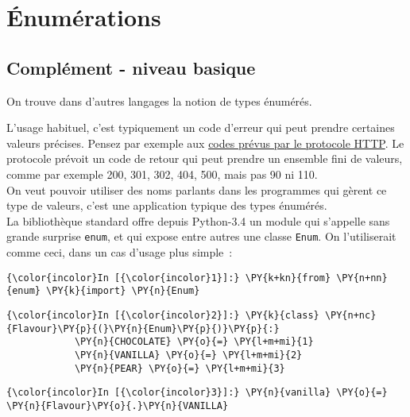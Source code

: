     \hypertarget{uxe9numuxe9rations}{%
\section{Énumérations}\label{uxe9numuxe9rations}}

    \hypertarget{compluxe9ment---niveau-basique}{%
\subsection{Complément - niveau
basique}\label{compluxe9ment---niveau-basique}}

    On trouve dans d'autres langages la notion de types énumérés.

    L'usage habituel, c'est typiquement un code d'erreur qui peut prendre
certaines valeurs précises. Pensez par exemple aux
\href{https://fr.wikipedia.org/wiki/Liste_des_codes_HTTP}{codes prévus
par le protocole HTTP}. Le protocole prévoit un code de retour qui peut
prendre un ensemble fini de valeurs, comme par exemple 200, 301, 302,
404, 500, mais pas 90 ni 110.\\

    On veut pouvoir utiliser des noms parlants dans les programmes qui
gèrent ce type de valeurs, c'est une application typique des types
énumérés.\\

    La bibliothèque standard offre depuis Python-3.4 un module qui s'appelle
sans grande surprise \texttt{enum}, et qui expose entre autres une
classe \texttt{Enum}. On l'utiliserait comme ceci, dans un cas d'usage
plus simple~:

    \begin{Verbatim}[commandchars=\\\{\}]
{\color{incolor}In [{\color{incolor}1}]:} \PY{k+kn}{from} \PY{n+nn}{enum} \PY{k}{import} \PY{n}{Enum}
\end{Verbatim}


    \begin{Verbatim}[commandchars=\\\{\}]
{\color{incolor}In [{\color{incolor}2}]:} \PY{k}{class} \PY{n+nc}{Flavour}\PY{p}{(}\PY{n}{Enum}\PY{p}{)}\PY{p}{:}
            \PY{n}{CHOCOLATE} \PY{o}{=} \PY{l+m+mi}{1}
            \PY{n}{VANILLA} \PY{o}{=} \PY{l+m+mi}{2}
            \PY{n}{PEAR} \PY{o}{=} \PY{l+m+mi}{3}
\end{Verbatim}


    \begin{Verbatim}[commandchars=\\\{\}]
{\color{incolor}In [{\color{incolor}3}]:} \PY{n}{vanilla} \PY{o}{=} \PY{n}{Flavour}\PY{o}{.}\PY{n}{VANILLA}
\end{Verbatim}



